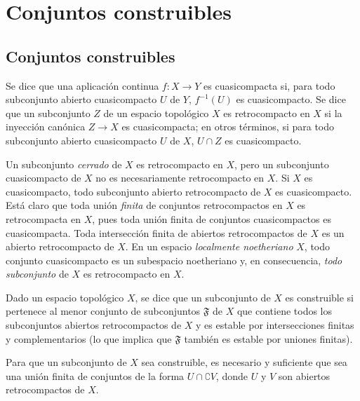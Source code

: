 \section{Conjuntos construibles}
\label{section:0.9}
\label{section:0.9-fr}

\subsection{Conjuntos construibles}
\label{subsection:0.9.1}
\label{subsection:0.9.1-fr}

\begin{definition}[9.1.1]
\label{0.9.1.1}
\label{0.9.1.1-fr}
Se dice que una aplicación continua $f:X\to Y$ es cuasicompacta si, para todo subconjunto abierto cuasicompacto $U$ de $Y$, $f^{-1}(U)$ es cuasicompacto.
Se dice que un subconjunto $Z$ de un espacio topológico $X$ es retrocompacto en $X$ si la inyección canónica $Z\to X$ es cuasicompacta; en otros términos, si para todo subconjunto abierto cuasicompacto $U$ de $X$, $U\cap Z$ es cuasicompacto.
\end{definition}

Un subconjunto \emph{cerrado} de $X$ es retrocompacto en $X$, pero un subconjunto cuasicompacto de $X$ no es necesariamente retrocompacto en $X$.
Si $X$ es cuasicompacto, todo subconjunto abierto retrocompacto de $X$ es cuasicompacto.
Está claro que toda unión \emph{finita} de conjuntos retrocompactos en $X$ es retrocompacta en $X$, pues toda unión finita de conjuntos cuasicompactos es cuasicompacta.
Toda intersección finita de abiertos retrocompactos de $X$ es un abierto retrocompacto de $X$.
En un espacio \emph{localmente noetheriano} $X$, todo conjunto cuasicompacto es un subespacio noetheriano y, en consecuencia, \emph{todo subconjunto} de $X$ es retrocompacto en $X$.

\begin{definition}[9.1.2]
\label{0.9.1.2}
\label{0.9.1.2-fr}
Dado un espacio topológico $X$, se dice que un subconjunto de $X$ es construible si pertenece al menor conjunto de subconjuntos $\mathfrak{F}$ de $X$ que contiene todos los subconjuntos abiertos retrocompactos de $X$ y es estable por intersecciones finitas y complementarios \textup{(lo que implica que $\mathfrak{F}$ también es} estable por uniones finitas\textup{)}.
\end{definition}

\begin{proposition}[9.1.3]
\label{0.9.1.3}
\label{0.9.1.3-fr}
Para que un subconjunto de $X$ sea construible, es necesario y suficiente que sea una unión finita de conjuntos de la forma $U\cap\complement{V}$, donde $U$ y $V$ son abiertos retrocompactos de $X$.
\end{proposition}


